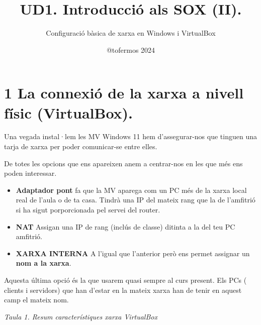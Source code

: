 \documentclass[
  a4paper,
]{article}
\title{UD1. Introducció als SOX (II).}
\subtitle{Configuració bàsica de xarxa en Windows i VirtualBox}
\author{@tofermos 2024}
\date{}
\begin{document}
\maketitle

{
\setcounter{tocdepth}{2}
\tableofcontents
}
\newpage

\renewcommand\tablename{Tabla}

\section{1 La connexió de la xarxa a nivell físic
(VirtualBox).}\label{la-connexiuxf3-de-la-xarxa-a-nivell-fuxedsic-virtualbox.}

Una vegada instal·lem les MV Windows 11 hem d'assegurar-nos que tinguen
una tarja de xarxa per poder comunicar-se entre elles.

De totes les opcions que ens apareixen anem a centrar-nos en les que més
ens poden interessar.

\begin{itemize}
\item
  \textbf{Adaptador pont} fa que la MV aparega com un PC més de la xarxa
  local real de l'aula o de ta casa. Tindrà una IP del mateix rang que
  la de l'amfitrió si ha sigut porporcionada pel servei del router.
\item
  \textbf{NAT} Assigan una IP de rang (inclús de classe) ditinta a la
  del teu PC amfitrió.
\item
  \textbf{XARXA INTERNA} A l'igual que l'anterior però ens permet
  assignar un \textbf{nom a la xarxa}.
\end{itemize}

Aquesta última opció és la que usarem quasi sempre al curs present. Els
PCs ( clients i servidors) que han d'estar en la mateix xarxa han de
tenir en aquest camp el mateix nom.

\emph{Taula 1. Resum característiques xarxa VirtualBox}
\end{document}
